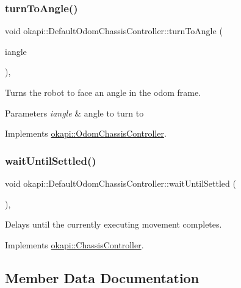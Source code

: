 \subsubsection{\texorpdfstring{turnToAngle()}{turnToAngle()}}
{\footnotesize\ttfamily void okapi\+::\+Default\+Odom\+Chassis\+Controller\+::turn\+To\+Angle (\begin{DoxyParamCaption}\item[{const Q\+Angle \&}]{iangle }\end{DoxyParamCaption})\hspace{0.3cm}{\ttfamily [override]}, {\ttfamily [virtual]}}

Turns the robot to face an angle in the odom frame.


\begin{DoxyParams}{Parameters}
{\em iangle} & angle to turn to \\
\hline
\end{DoxyParams}


Implements \mbox{\hyperlink{classokapi_1_1OdomChassisController_ac90298bb9081d95c52800dbf679dd658}{okapi\+::\+Odom\+Chassis\+Controller}}.

\mbox{\label{classokapi_1_1DefaultOdomChassisController_a44599379129060bdb44e6f603ee5777b}} 
\subsubsection{\texorpdfstring{waitUntilSettled()}{waitUntilSettled()}}
{\footnotesize\ttfamily void okapi\+::\+Default\+Odom\+Chassis\+Controller\+::wait\+Until\+Settled (\begin{DoxyParamCaption}{ }\end{DoxyParamCaption})\hspace{0.3cm}{\ttfamily [override]}, {\ttfamily [virtual]}}

Delays until the currently executing movement completes. 

Implements \mbox{\hyperlink{classokapi_1_1ChassisController_a01ed4e0eb7332cc149228387bbf1e91c}{okapi\+::\+Chassis\+Controller}}.



\subsection{Member Data Documentation}
\mbox{\label{classokapi_1_1DefaultOdomChassisController_a0513b32bd09e7af2b82a5d67895b6165}} 
